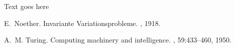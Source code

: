 \documentclass[12pt, a4paper,oneside]{book}
\numberwithin{equation}{section}
\begin{document}
Text goes here




\begin{thebibliography}{999}




E.~Noether.
\newblock Invariante {V}ariationsprobleme.
, 1918.

A.~M. Turing.
\newblock Computing machinery and intelligence.
, 59:433--460, 1950.

\end{thebibliography}
\end{document}
